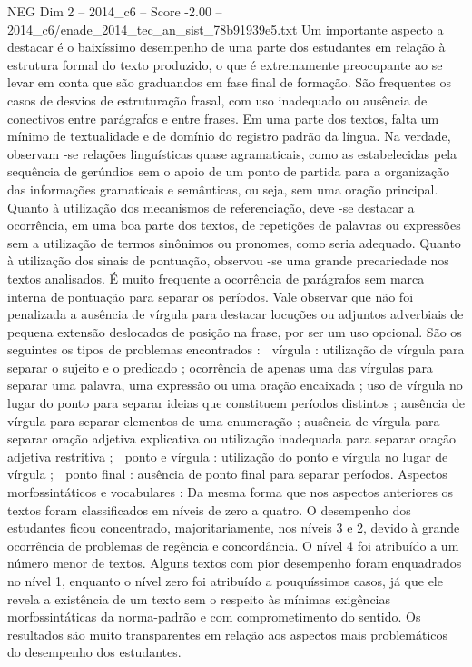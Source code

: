 \begin{textsample}{NEG Dim 2 – 2014\_c6 – Score -2.00 – 2014\_c6/enade\_2014\_tec\_an\_sist\_78b91939e5.txt}
Um importante aspecto a destacar é o baixíssimo desempenho de uma parte dos estudantes em relação à estrutura formal do texto produzido, o que é extremamente preocupante ao se levar em conta que são graduandos em fase final de formação.
São frequentes os casos de desvios de estruturação frasal, com uso inadequado ou ausência de conectivos entre parágrafos e entre frases.
Em uma parte dos textos, falta um mínimo de textualidade e de domínio do registro padrão da língua.
Na verdade, observam -se relações linguísticas quase agramaticais, como as estabelecidas pela sequência de gerúndios sem o apoio de um ponto de partida para a organização das informações gramaticais e semânticas, ou seja, sem uma oração principal.
Quanto à utilização dos mecanismos de referenciação, deve -se destacar a ocorrência, em uma boa parte dos textos, de repetições de palavras ou expressões sem a utilização de termos sinônimos ou pronomes, como seria adequado.
Quanto à utilização dos sinais de pontuação, observou -se uma grande precariedade nos textos analisados.
É muito frequente a ocorrência de parágrafos sem marca interna de pontuação para separar os períodos.
Vale observar que não foi penalizada a ausência de vírgula para destacar locuções ou adjuntos adverbiais de pequena extensão deslocados de posição na frase, por ser um uso opcional.
São os seguintes os tipos de problemas encontrados :  vírgula : utilização de vírgula para separar o sujeito e o predicado ; ocorrência de apenas uma das vírgulas para separar uma palavra, uma expressão ou uma oração encaixada ; uso de vírgula no lugar do ponto para separar ideias que constituem períodos distintos ; ausência de vírgula para separar elementos de uma enumeração ; ausência de vírgula para separar oração adjetiva explicativa ou utilização inadequada para separar oração adjetiva restritiva ;  ponto e vírgula : utilização do ponto e vírgula no lugar de vírgula ;  ponto final : ausência de ponto final para separar períodos.
Aspectos morfossintáticos e vocabulares : Da mesma forma que nos aspectos anteriores os textos foram classificados em níveis de zero a quatro.
O desempenho dos estudantes ficou concentrado, majoritariamente, nos níveis 3 e 2, devido à grande ocorrência de problemas de regência e concordância.
O nível 4 foi atribuído a um número menor de textos.
Alguns textos com pior desempenho foram enquadrados no nível 1, enquanto o nível zero foi atribuído a pouquíssimos casos, já que ele revela a existência de um texto sem o respeito às mínimas exigências morfossintáticas da norma-padrão e com comprometimento do sentido.
Os resultados são muito transparentes em relação aos aspectos mais problemáticos do desempenho dos estudantes.

\end{textsample}
